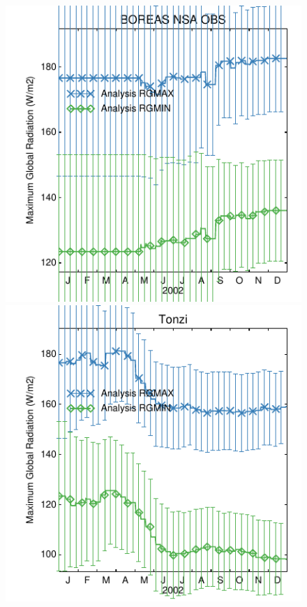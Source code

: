 \documentclass[a4paper,12pt]{article}
\begin{document}
\begin{figure}[hp]
\begin{center}
\includegraphics[scale=0.5]{BOREAS_NSA_OBS.dayplot.2002.RGMAX.MODIS.pdf}
\includegraphics[scale=0.5]{Tonzi.dayplot.2002.RGMAX.MODIS.pdf}

\end{center}
\end{figure}
\end{document}
